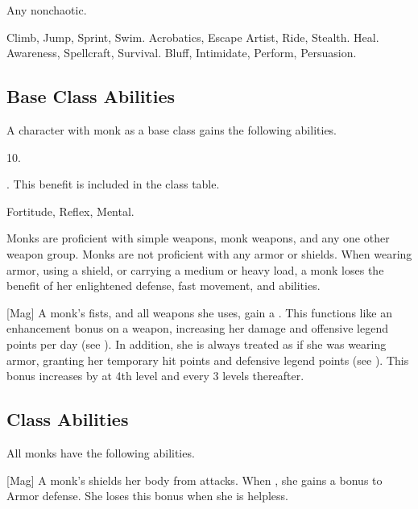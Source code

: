      Any nonchaotic.

     Climb, Jump, Sprint, Swim.
     Acrobatics, Escape Artist, Ride, Stealth.
     Heal.
     Awareness, Spellcraft, Survival.
     Bluff, Intimidate, Perform, Persuasion.

    \subsection{Base Class Abilities}
        A character with monk as a base class gains the following abilities.

         10.

         . This benefit is included in the class table.

          Fortitude,  Reflex,  Mental.

        Monks are proficient with simple weapons, monk weapons, and any one other weapon group.
        Monks are not proficient with any armor or shields.
        When wearing armor, using a shield, or carrying a medium or heavy load, a monk loses the benefit of her enlightened defense, fast movement, and \ki abilities.

        [Mag] A monk's fists, and all weapons she uses, gain a  .
        This functions like an enhancement bonus on a weapon, increasing her damage and offensive legend points per day (see ).
        In addition, she is always treated as if she was wearing  armor, granting her temporary hit points and defensive legend points (see ).
        This bonus increases by  at 4th level and every 3 levels thereafter.

    \subsection{Class Abilities}
        All monks have the following abilities.

        [Mag]
        A monk's \ki shields her body from attacks.
        When \monkunencumbered, she gains a  bonus to Armor defense.
        She loses this bonus when she is helpless.

